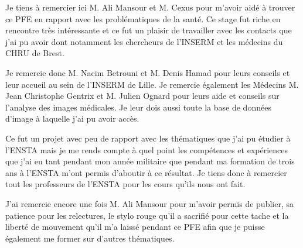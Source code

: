 Je tiens à remercier ici M. Ali Mansour et M. Cexus pour m'avoir aidé à trouver ce PFE en rapport avec les problématiques de la santé. Ce stage fut riche en rencontre très intéressante et ce fut un plaisir de travailler avec les contacts que j'ai pu avoir dont notamment les chercheurs de l'INSERM et les médecins du CHRU de Brest.

Je remercie donc M. Nacim Betrouni et M. Denis Hamad pour leurs conseils et leur accueil au sein de l'INSERM de Lille. Je remercie également les Médecins M. Jean Christophe Gentrix et M. Julien Ognard pour leurs aide et conseils sur l'analyse des images médicales. Je leur dois aussi toute la base de données d'image à laquelle j'ai pu avoir accès.

Ce fut un projet avec peu de rapport avec les thématiques que j'ai pu étudier à l'ENSTA mais je me rends compte à quel point les compétences et expériences que j'ai eu tant pendant mon année militaire que pendant ma formation de trois ans à l'ENSTA m'ont permis d'aboutir à ce résultat. Je tiens donc à remercier tout les professeurs de l'ENSTA pour les cours qu'ils nous ont fait.

J'ai remercie encore une fois M. Ali Mansour pour m'avoir permis de publier, sa patience pour les relectures, le stylo rouge qu'il a sacrifié pour cette tache et la liberté de mouvement qu'il m'a laissé pendant ce PFE afin que je puisse également me former sur d'autres thématiques.